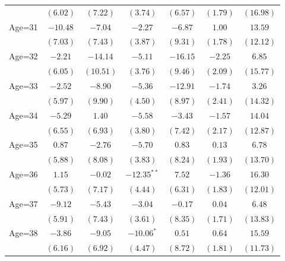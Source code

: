 \documentclass[fullpage]{paper}
\begin{document}
\begin{center}
\begin{longtable}{l c c c c c c }
            & $(6.02)$      & $(7.22)$       & $(3.74)$       & $(6.57)$      & $(1.79)$      & $(16.98)$     \\
Age=31      & $-10.48$      & $-7.04$        & $-2.27$        & $-6.87$       & $1.00$        & $13.59$       \\
            & $(7.03)$      & $(7.43)$       & $(3.87)$       & $(9.31)$      & $(1.78)$      & $(12.12)$     \\
Age=32      & $-2.21$       & $-14.14$       & $-5.11$        & $-16.15$      & $-2.25$       & $6.85$        \\
            & $(6.05)$      & $(10.51)$      & $(3.76)$       & $(9.46)$      & $(2.09)$      & $(15.77)$     \\
Age=33      & $-2.52$       & $-8.90$        & $-5.36$        & $-12.91$      & $-1.74$       & $3.26$        \\
            & $(5.97)$      & $(9.90)$       & $(4.50)$       & $(8.97)$      & $(2.41)$      & $(14.32)$     \\
Age=34      & $-5.29$       & $1.40$         & $-5.58$        & $-3.43$       & $-1.57$       & $14.04$       \\
            & $(6.55)$      & $(6.93)$       & $(3.80)$       & $(7.42)$      & $(2.17)$      & $(12.87)$     \\
Age=35      & $0.87$        & $-2.76$        & $-5.70$        & $0.83$        & $0.13$        & $6.78$        \\
            & $(5.88)$      & $(8.08)$       & $(3.83)$       & $(8.24)$      & $(1.93)$      & $(13.70)$     \\
Age=36      & $1.15$        & $-0.02$        & $-12.35^{**}$  & $7.52$        & $-1.36$       & $16.30$       \\
            & $(5.73)$      & $(7.17)$       & $(4.44)$       & $(6.31)$      & $(1.83)$      & $(12.01)$     \\
Age=37      & $-9.12$       & $-5.43$        & $-3.04$        & $-0.17$       & $0.04$        & $6.48$        \\
            & $(5.91)$      & $(7.43)$       & $(3.61)$       & $(8.35)$      & $(1.71)$      & $(13.83)$     \\
Age=38      & $-3.86$       & $-9.05$        & $-10.06^{*}$   & $0.51$        & $0.64$        & $15.59$       \\
            & $(6.16)$      & $(6.92)$       & $(4.47)$       & $(8.72)$      & $(1.81)$      & $(11.73)$     \\

\end{longtable}
\end{center}
\end{document}
